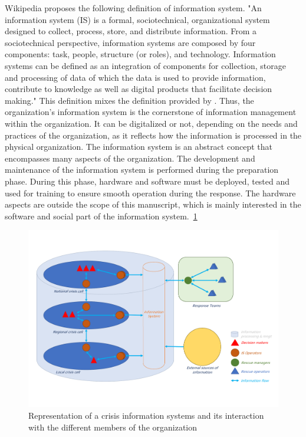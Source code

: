 Wikipedia \cite{InformationSystem2021} proposes the following definition of information system.
"An information system (IS) is a formal, sociotechnical, organizational system designed to collect, process, store, and distribute information.
From a sociotechnical perspective, information systems are composed by four components: task, people, structure (or roles), and technology.
Information systems can be defined as an integration of components for collection, storage and processing of data of which the data is used
to provide information, contribute to knowledge as well as digital products that facilitate decision making."
This definition mixes the definition provided by \cite{oharaManagingThreeLevels1999,piccoliInformationSystemsManagers2019,zwassInformationSystemDefinition}.
Thus, the organization's information system is the cornerstone of information management within the organization.
It can be digitalized or not, depending on the needs and practices of the organization, as it reflects how the information is processed in the physical organization.
The information system is an abstract concept that encompasses many aspects of the organization.
The development and maintenance of the information system is performed during the preparation phase.
During this phase, hardware and software must be deployed, tested and used for training to ensure smooth operation during the response.
The hardware aspects are outside the scope of this manuscript, which is mainly interested in the software and social part of the information system.~\ref{context:information-system}
\begin{figure}[h]
    \centering
    \includegraphics[width=\textwidth]{figures/information-system.pdf}
    \caption{Representation of a crisis information systems and its interaction with the different members of the organization}
    \label{context:information-system}
\end{figure}
